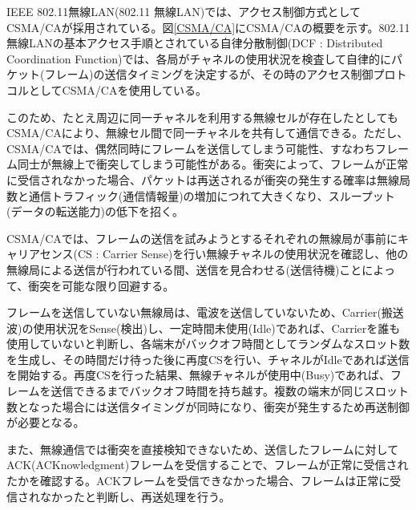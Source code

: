 \documentclass[a4paper,10pt]{ltjsarticle}
\begin{document}
IEEE 802.11無線LAN(802.11 無線LAN)では、アクセス制御方式としてCSMA/CAが採用されている。図\ref{CSMA/CA}にCSMA/CAの概要を示す。802.11 無線LANの基本アクセス手順とされている自律分散制御(DCF : Distributed Coordination Function)では、各局がチャネルの使用状況を検査して自律的にパケット(フレーム)の送信タイミングを決定するが、その時のアクセス制御プロトコルとしてCSMA/CAを使用している。

このため、たとえ周辺に同一チャネルを利用する無線セルが存在したとしてもCSMA/CAにより、無線セル間で同一チャネルを共有して通信できる。ただし、CSMA/CAでは、偶然同時にフレームを送信してしまう可能性、すなわちフレーム同士が無線上で衝突してしまう可能性がある。衝突によって、フレームが正常に受信されなかった場合、パケットは再送されるが衝突の発生する確率は無線局数と通信トラフィック(通信情報量)の増加につれて大きくなり、スループット(データの転送能力)の低下を招く。

CSMA/CAでは、フレームの送信を試みようとするそれぞれの無線局が事前にキャリアセンス(CS : Carrier Sense)を行い無線チャネルの使用状況を確認し、他の無線局による送信が行われている間、送信を見合わせる(送信待機)ことによって、衝突を可能な限り回避する。

フレームを送信していない無線局は、電波を送信していないため、Carrier(搬送波)の使用状況をSense(検出)し、一定時間未使用(Idle)であれば、Carrierを誰も使用していないと判断し、各端末がバックオフ時間としてランダムなスロット数を生成し、その時間だけ待った後に再度CSを行い、チャネルがIdleであれば送信を開始する。再度CSを行った結果、無線チャネルが使用中(Busy)であれば、フレームを送信できるまでバックオフ時間を持ち越す。複数の端末が同じスロット数となった場合には送信タイミングが同時になり、衝突が発生するため再送制御が必要となる。

また、無線通信では衝突を直接検知できないため、送信したフレームに対してACK(ACKnowledgment)フレームを受信することで、フレームが正常に受信されたかを確認する。ACKフレームを受信できなかった場合、フレームは正常に受信されなかったと判断し、再送処理を行う。
\end{document}

